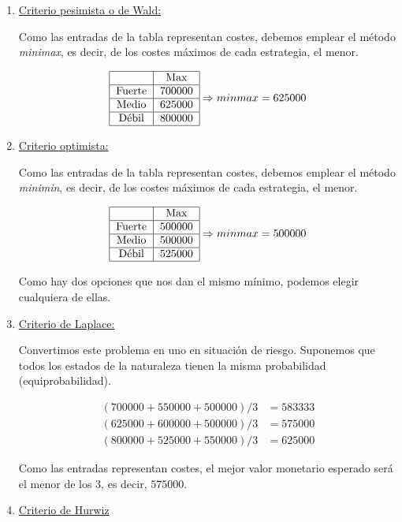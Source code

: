 \documentclass[12pt]{article}
\theoremstyle{definition}
\theoremstyle{remark}
\begin{document}
\begin{enumerate}
\item \underline{Criterio pesimista o de Wald:}

Como las entradas de la tabla representan costes, debemos emplear el método \textit{minimax}, es decir, de los costes máximos de cada estrategia, el menor.

\[
\begin{tabular}{|c|c|}
\hline 
 & Max \\ 
\hline 
Fuerte & 700000 \\ 
\hline 
Medio & 625000 \\ 
\hline 
Débil & 800000 \\ 
\hline 
\end{tabular} \Rightarrow minmax = 625000
\]
\item \underline{Criterio optimista:}

Como las entradas de la tabla representan costes, debemos emplear el método \textit{minimin}, es decir, de los costes máximos de cada estrategia, el menor.

\[
\begin{tabular}{|c|c|}
\hline 
 & Max \\ 
\hline 
Fuerte & 500000 \\ 
\hline 
Medio & 500000 \\ 
\hline 
Débil & 525000 \\ 
\hline 
\end{tabular} \Rightarrow minmax = 500000
\]

Como hay dos opciones que nos dan el mismo mínimo, podemos elegir cualquiera de ellas.

\item \underline{Criterio de Laplace:}

Convertimos este problema en uno en situación de riesgo. Suponemos que todos los estados de la naturaleza tienen la misma probabilidad (equiprobabilidad).

\[
\begin{array}{cc}
(700000+550000+500000)/3 & = 583333 \\
(625000+600000+500000)/3 & = 575000 \\
(800000+525000+550000)/3 & = 625000
\end{array}
\]

Como las entradas representan costes, el mejor valor monetario esperado será el menor de los 3, es decir, $575000$.

\item \underline{Criterio de Hurwiz}


\end{enumerate}
\end{document}
